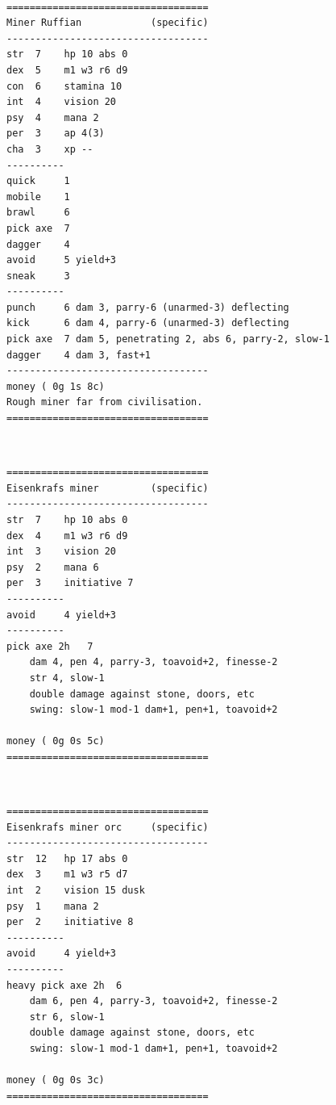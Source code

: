 \

\goodbreak \begin{samepage} \vsmall \begin{verbatim}
===================================
Miner Ruffian            (specific)
-----------------------------------
str  7    hp 10 abs 0
dex  5    m1 w3 r6 d9
con  6    stamina 10
int  4    vision 20
psy  4    mana 2
per  3    ap 4(3)
cha  3    xp --
----------
quick     1
mobile    1
brawl     6
pick axe  7
dagger    4
avoid     5 yield+3
sneak     3
----------
punch     6 dam 3, parry-6 (unarmed-3) deflecting
kick      6 dam 4, parry-6 (unarmed-3) deflecting
pick axe  7 dam 5, penetrating 2, abs 6, parry-2, slow-1
dagger    4 dam 3, fast+1
-----------------------------------
money ( 0g 1s 8c)
Rough miner far from civilisation.
===================================
\end{verbatim} \normalsize \end{samepage}

\

\goodbreak \begin{samepage} \vsmall \begin{verbatim}
===================================
Eisenkrafs miner         (specific)
-----------------------------------
str  7    hp 10 abs 0
dex  4    m1 w3 r6 d9
int  3    vision 20
psy  2    mana 6
per  3    initiative 7
----------
avoid     4 yield+3
----------
pick axe 2h   7
    dam 4, pen 4, parry-3, toavoid+2, finesse-2
    str 4, slow-1
    double damage against stone, doors, etc
    swing: slow-1 mod-1 dam+1, pen+1, toavoid+2

money ( 0g 0s 5c)
===================================
\end{verbatim} \normalsize \end{samepage}

\

\goodbreak \begin{samepage} \vsmall \begin{verbatim}
===================================
Eisenkrafs miner orc     (specific)
-----------------------------------
str  12   hp 17 abs 0
dex  3    m1 w3 r5 d7
int  2    vision 15 dusk
psy  1    mana 2
per  2    initiative 8
----------
avoid     4 yield+3
----------
heavy pick axe 2h  6
    dam 6, pen 4, parry-3, toavoid+2, finesse-2
    str 6, slow-1
    double damage against stone, doors, etc
    swing: slow-1 mod-1 dam+1, pen+1, toavoid+2

money ( 0g 0s 3c)
===================================
\end{verbatim} \normalsize \end{samepage}

